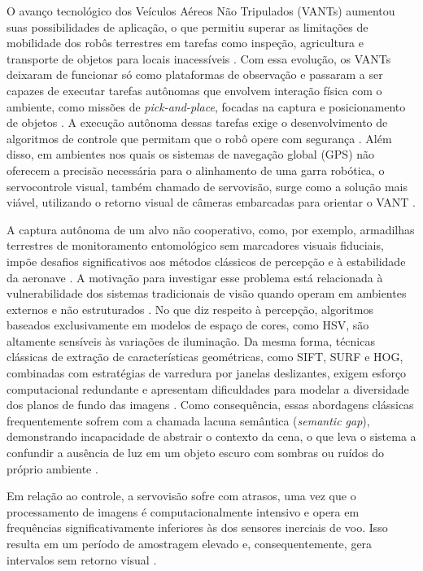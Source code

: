 O avanço tecnológico dos Veículos Aéreos Não Tripulados (VANTs) aumentou suas possibilidades de aplicação, o que permitiu superar as limitações de mobilidade dos robôs terrestres em tarefas como inspeção, agricultura e transporte de objetos para locais inacessíveis \cite{carvajal2024}. Com essa evolução, os VANTs deixaram de funcionar só como plataformas de observação e passaram a ser capazes de executar tarefas autônomas que envolvem interação física com o ambiente, como missões de \textit{pick-and-place}, focadas na captura e posicionamento de objetos \cite{abuzayed2020, cocuzza2021}. A execução autônoma dessas tarefas exige o desenvolvimento de algoritmos de controle que permitam que o robô opere com segurança \cite{carvajal2024}. Além disso, em ambientes nos quais os sistemas de navegação global (GPS) não oferecem a precisão necessária para o alinhamento de uma garra robótica, o servocontrole visual, também chamado de servovisão, surge como a solução mais viável, utilizando o retorno visual de câmeras embarcadas para orientar o VANT \cite{shang2016}.

A captura autônoma de um alvo não cooperativo, como, por exemplo, armadilhas terrestres de monitoramento entomológico sem marcadores visuais fiduciais, impõe desafios significativos aos métodos clássicos de percepção e à estabilidade da aeronave \cite{zhao2019}. A motivação para investigar esse problema está relacionada à vulnerabilidade dos sistemas tradicionais de visão quando operam em ambientes externos e não estruturados \cite{zhao2019}. No que diz respeito à percepção, algoritmos baseados exclusivamente em modelos de espaço de cores, como HSV, são altamente sensíveis às variações de iluminação. Da mesma forma, técnicas clássicas de extração de características geométricas, como SIFT, SURF e HOG, combinadas com estratégias de varredura por janelas deslizantes, exigem esforço computacional redundante e apresentam dificuldades para modelar a diversidade dos planos de fundo das imagens \cite{zhao2019}. Como consequência, essas abordagens clássicas frequentemente sofrem com a chamada lacuna semântica (\textit{semantic gap}), demonstrando incapacidade de abstrair o contexto da cena, o que leva o sistema a confundir a ausência de luz em um objeto escuro com sombras ou ruídos do próprio ambiente \cite{zhao2019}.

Em relação ao controle, a servovisão sofre com atrasos, uma vez que o processamento de imagens é computacionalmente intensivo e opera em frequências significativamente inferiores às dos sensores inerciais de voo. Isso resulta em um período de amostragem elevado e, consequentemente, gera intervalos sem retorno visual \cite{shang2016}. 

